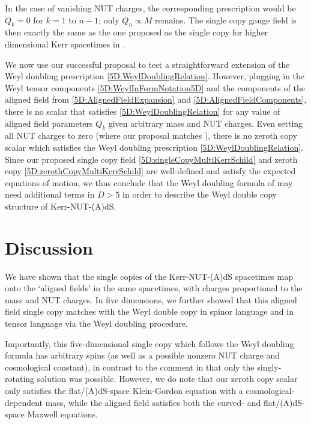 In the
case of vanishing NUT charges, the corresponding prescription would be $Q_{k} = 0$ for $k = 1$ to $n - 1$; only $Q_n\propto M$ remains. The
single copy gauge field is then exactly the same as the one proposed as the single copy for higher
dimensional Kerr spacetimes in \cite{Monteiro:2014cda}.

We now use our successful proposal to test a straightforward extension of the Weyl doubling prescription
\eqref{5D:WeylDoublingRelation}. However, plugging in the Weyl tensor components \eqref{5D:WeylInFormNotation5D} and the
components of the aligned field from \eqref{5D:AlignedFieldExpansion} and \eqref{5D:AlignedFieldComponents}, there is no
scalar that satisfies \eqref{5D:WeylDoublingRelation} for any value of aligned field parameters $Q_{k}$ given
arbitrary mass and NUT charges. Even setting all NUT charges to zero (where our proposal matches
\cite{Monteiro:2014cda}), there is no zeroth copy scalar which satisfies the Weyl doubling prescription
\eqref{5D:WeylDoublingRelation}. Since our proposed single copy field \eqref{5D:singleCopyMultiKerrSchild} and zeroth
copy \eqref{5D:zerothCopyMultiKerrSchild} are well-defined and satisfy the expected equations of motion, we thus
conclude that the Weyl doubling formula of \cite{Alawadhi:2020jrv} may need additional terms in $D > 5$ in order to
describe the Weyl double copy structure of Kerr-NUT-(A)dS. 


\section{Discussion}\label{5D:sec:discussion}

We have shown that the single copies of the Kerr-NUT-(A)dS spacetimes map onto the `aligned fields' in the same
spacetimes, with charges proportional to the mass and NUT charges.  In five dimensions, we further showed that this
aligned field single copy matches with the Weyl double copy in spinor language and in
tensor language via the Weyl doubling procedure.  

Importantly, this five-dimensional single copy which follows the Weyl doubling formula has arbitrary spins (as well
as a possible nonzero NUT charge and cosmological constant), in contrast to the comment in \cite{Alawadhi:2020jrv}
that only the singly-rotating solution was possible. However, we do note that our zeroth copy scalar only satisfies the flat/(A)dS-space Klein-Gordon equation with a
cosmological-dependent mass, while the aligned field satisfies both the curved- and flat/(A)dS-space Maxwell equations.

